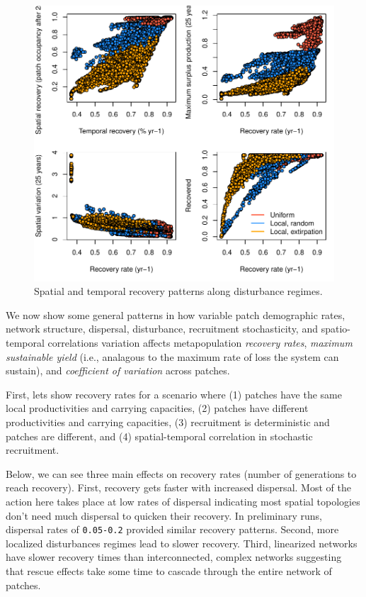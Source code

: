 \documentclass[]{article}
\begin{document}
\begin{figure}[H]

{\centering \includegraphics{Managing_for_ecological_surprises_in_metapopulations_makeHTML_files/figure-latex/disturbance regime-1} 

}

\caption{Spatial and temporal recovery patterns along disturbance regimes.}\label{fig:disturbance regime}
\end{figure}

We now show some general patterns in how variable patch demographic
rates, network structure, dispersal, disturbance, recruitment
stochasticity, and spatio-temporal correlations variation affects
metapopulation \emph{recovery rates}, \emph{maximum sustainable yield}
(i.e., analagous to the maximum rate of loss the system can sustain),
and \emph{coefficient of variation} across patches.

First, lets show recovery rates for a scenario where (1) patches have
the same local productivities and carrying capacities, (2) patches have
different productivities and carrying capacities, (3) recruitment is
deterministic and patches are different, and (4) spatial-temporal
correlation in stochastic recruitment.

Below, we can see three main effects on recovery rates (number of
generations to reach recovery). First, recovery gets faster with
increased dispersal. Most of the action here takes place at low rates of
dispersal indicating most spatial topologies don't need much dispersal
to quicken their recovery. In preliminary runs, dispersal rates of
\texttt{0.05-0.2} provided similar recovery patterns. Second, more
localized disturbances regimes lead to slower recovery. Third,
linearized networks have slower recovery times than interconnected,
complex networks suggesting that rescue effects take some time to
cascade through the entire network of patches.
\end{document}
